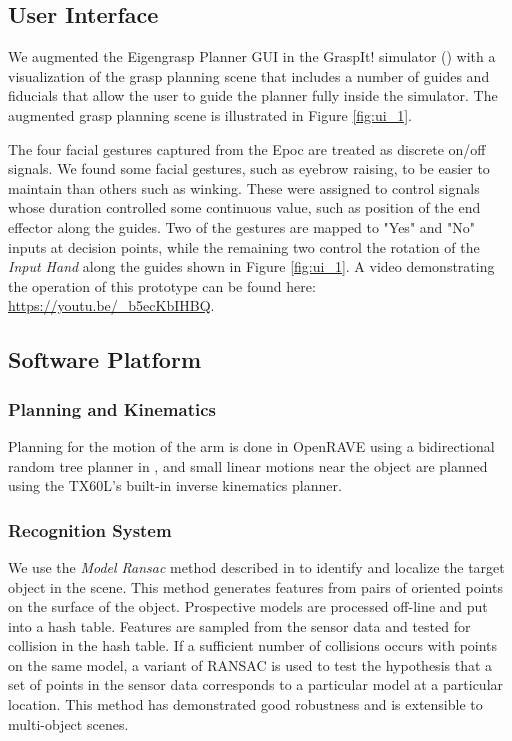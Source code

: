 \subsection{User Interface}
We augmented the Eigengrasp Planner GUI in the GraspIt! simulator (\cite{Miller2004}) with a visualization of the grasp planning scene that includes a number of guides and fiducials that allow the user to guide the planner fully inside the simulator. The augmented grasp planning scene is illustrated in Figure \ref{fig:ui_1}. 

The four facial gestures captured from the Epoc are treated as discrete on/off signals. We found some facial gestures, such as eyebrow raising, to be easier to maintain than others such as winking. These were assigned to control signals whose duration controlled some continuous value, such as position of the end effector along the guides. Two of the gestures are mapped to "Yes" and "No" inputs at decision points, while the remaining two control the rotation of the \emph{Input Hand} along the guides shown in Figure \ref{fig:ui_1}. A video demonstrating the operation of this prototype can be found here: \url{https://youtu.be/_b5ecKbIHBQ}.

\subsection{Software Platform}

\subsubsection{Planning and Kinematics}
Planning for the motion of the arm is done in OpenRAVE using a bidirectional random tree planner in \cite{berenson-cbirrt}, and small linear motions near the object are planned using the TX60L's built-in inverse kinematics planner.

\subsubsection{Recognition System}
\label{sec:rec_system}
 We use the \emph{Model Ransac} method described in \cite{EfficientModelRansac} to identify and localize the target object in the scene. This method generates features from pairs of oriented points on the surface of the object. Prospective models are processed off-line and put into a hash table. Features are sampled from the sensor data and tested for collision in the hash table. If a sufficient number of collisions occurs with points on the same model, a variant of RANSAC is used to test the hypothesis that a set of points in the sensor data corresponds to a particular model at a particular location. This method has demonstrated good robustness and is extensible to multi-object scenes. 

